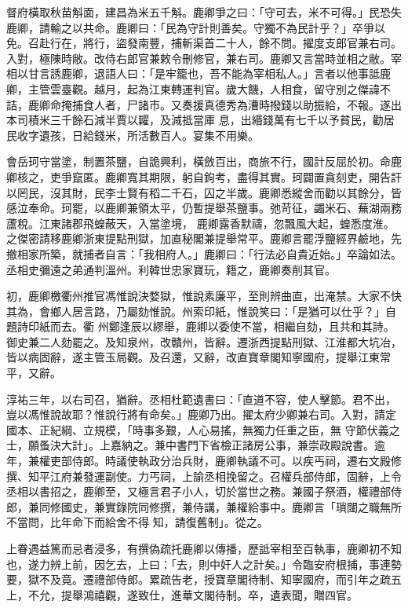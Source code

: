 \begin{pinyinscope}
 督府橫取秋苗斛面，建昌為米五千斛。鹿卿爭之曰：「守可去，米不可得。」民恐失鹿卿，請輸之以共命。鹿卿曰：「民為守計則善矣。守獨不為民計乎？」卒爭以
 免。召赴行在，將行，盜發南豐，捕斬渠首二十人，餘不問。擢度支郎官兼右司。入對，極陳時敝。改侍右郎官兼敕令刪修官，兼右司。鹿卿又言當時並相之敝。宰相以甘言誘鹿卿，退語人曰：「是牢籠也，吾不能為宰相私人。」言者以他事詆鹿卿，主管雲臺觀。越月，起為江東轉運判官。歲大饑，人相食，留守別之傑諱不詰，鹿卿命掩捕食人者，尸諸市。又奏援真德秀為漕時撥錢以助振給，不報。遂出本司積米三千餘石減半賈以糶，及減抵當庫
 息，出緡錢萬有七千以予貧民，勸居民收字遺孩，日給錢米，所活數百人。宴集不用樂。



 會岳珂守當塗，制置茶鹽，自詭興利，橫斂百出，商旅不行，國計反屈於初。命鹿卿核之，吏爭竄匿。鹿卿寬其期限，躬自鉤考，盡得其實。珂闢置貪刻吏，開告訐以罔民，沒其財，民李士賢有稻二千石，囚之半歲。鹿卿悉縱舍而勸以其餘分，皆感泣奉命。珂罷，以鹿卿兼領太平，仍暫提舉茶鹽事。弛苛征，蠲米石、蕪湖兩務蘆稅。江東諸郡飛蝗蔽天，入當塗境，
 鹿卿露香默禱，忽飄風大起，蝗悉度淮。之傑密請移鹿卿浙東提點刑獄，加直秘閣兼提舉常平。鹿卿言罷浮鹽經界鹼地，先撤相家所築，就捕者自言：「我相府人。」鹿卿曰：「行法必自貴近始。」卒論如法。丞相史彌遠之弟通判溫州。利韓世忠家寶玩，籍之，鹿卿奏削其官。



 初，鹿卿檄衢州推官馮惟說決婺獄，惟說素廉平，至則辨曲直，出淹禁。大家不快其為，會鄉人居言路，乃屬劾惟說。州索印紙，惟說笑曰：「是猶可以仕乎？」自題詩印紙而去。衢
 州鄭逢辰以繆舉，鹿卿以委使不當，相繼自劾，且共和其詩。御史兼二人劾罷之。及知泉州，改贛州，皆辭。遷浙西提點刑獄、江淮都大坑冶，皆以病固辭，遂主管玉局觀。及召還，又辭，改直寶章閣知寧國府，提舉江東常平，又辭。



 淳祐三年，以右司召，猶辭。丞相杜範遺書曰：「直道不容，使人擊節。君不出，豈以馮惟說故耶？惟說行將有命矣。」鹿卿乃出。擢太府少卿兼右司。入對，請定國本、正紀綱、立規模，「時事多艱，人心易搖，無獨力任重之臣，無
 守節伏義之士，願蚤決大計」。上嘉納之。兼中書門下省檢正諸房公事，兼崇政殿說書。逾年，兼權吏部侍郎。時議使執政分治兵財，鹿卿執議不可。以疾丐祠，遷右文殿修撰、知平江府兼發運副使。力丐祠，上諭丞相挽留之。召權兵部侍郎，固辭，上令丞相以書招之，鹿卿至，又極言君子小人，切於當世之務。兼國子祭酒，權禮部侍郎，兼同修國史，兼實錄院同修撰，兼侍講，兼權給事中。鹿卿言「瑣闥之職無所不當問，比年命下而給舍不得
 知，請復舊制」。從之。



 上眷遇益篤而忌者浸多，有撰偽疏托鹿卿以傳播，歷詆宰相至百執事，鹿卿初不知也，遂力辨上前，因乞去，上曰：「去，則中奸人之計矣。」令臨安府根捕，事連勢要，獄不及竟。遷禮部侍郎。累疏告老，授寶章閣待制、知寧國府，而引年之疏五上，不允，提舉鴻禧觀，遂致仕，進華文閣待制。卒，遺表聞，贈四官。




\end{pinyinscope}
